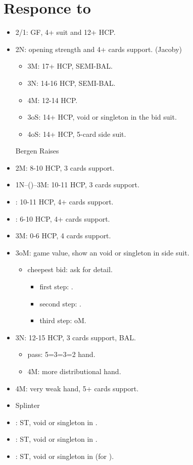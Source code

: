 \documentclass[12pt,twoside,a5paper]{report}%
\begin{document}
	\chapter*{Responce to }
	\begin{itemize}
	\renewcommand{\labelitemi}{}
	\item 2/1: GF, 4+ suit and 12+ HCP.
	\item 2N: opening strength and 4+ cards support. (Jacoby)
		\begin{itemize}
		\renewcommand{\labelitemi}{--}
		\item 3M: 17+ HCP, SEMI-BAL.
		\item 3N: 14-16 HCP, SEMI-BAL.
		\item 4M: 12-14 HCP.
		\item 3oS: 14+ HCP, void or singleton in the bid suit.
		\item 4oS: 14+ HCP, 5-card side suit.
		\end{itemize}
	Bergen Raises
	\item 2M: 8-10 HCP, 3 cards support.
	\item 1N--()--3M: 10-11 HCP, 3 cards support.
	\item {}: 10-11 HCP, 4+ cards support.
	\item {}: 6-10 HCP, 4+ cards support.
	\item 3M: 0-6 HCP, 4 cards support.
	\item 3oM: game value, show an void or singleton in side suit.
		\begin{itemize}
		\renewcommand{\labelitemi}{--}
		\item cheepest bid: ask for detail.
			\begin{itemize}
			\renewcommand{\labelitemi}{--}
				\item first step: \cl{}.
				\item second step: \di{}.
				\item third step: oM.
			\end{itemize}
		\end{itemize}
	\item 3N: 12-15 HCP, 3 cards support, BAL.
		\begin{itemize}
		\renewcommand{\labelitemi}{--}
		\item pass: 5=3=3=2 hand.
		\item 4M: more distributional hand.
		\end{itemize}
	\item 4M: very weak hand, 5+ cards support.
	\item Splinter
	\item {}: ST, void or singleton in \cl{}.
	\item {}: ST, void or singleton in \di{}.
	\item {}: ST, void or singleton in \he{} (for ).
	\end{itemize}
\end{document}
